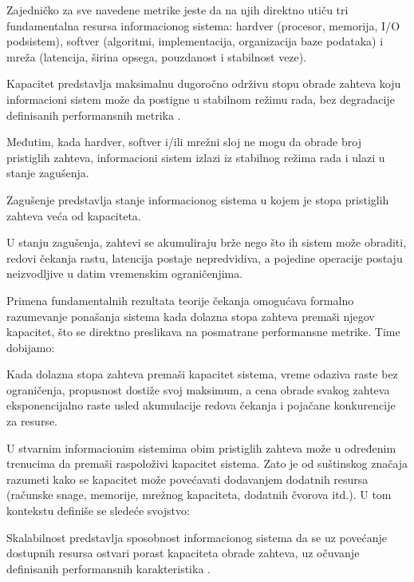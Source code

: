 Zajedničko za sve navedene metrike jeste da na njih direktno utiču tri fundamentalna resursa informacionog sistema: hardver (procesor, memorija, I/O podsistem), softver (algoritmi, implementacija, organizacija baze podataka) i mreža (latencija, širina opsega, pouzdanost i stabilnost veze).

\begin{definicija}
Kapacitet predstavlja maksimalnu dugoročno održivu stopu obrade zahteva koju informacioni sistem može da postigne u stabilnom režimu rada, bez degradacije definisanih performansnih metrika \cite{jain1991art}.
\end{definicija}

Međutim, kada hardver, softver i/ili mrežni sloj ne mogu da obrade broj pristiglih zahteva, informacioni sistem izlazi iz stabilnog režima rada i ulazi u stanje zagušenja.

\begin{definicija}
Zagušenje predstavlja stanje informacionog sistema u kojem je stopa pristiglih zahteva veća od kapaciteta.
\end{definicija}

U stanju zagušenja, zahtevi se akumuliraju brže nego što ih sistem može obraditi, redovi čekanja rastu, latencija postaje nepredvidiva, a pojedine operacije postaju neizvodljive u datim vremenskim ograničenjima.

Primena fundamentalnih rezultata teorije čekanja \cite{adan2002queueing} omogućava formalno razumevanje ponašanja sistema kada dolazna stopa zahteva premaši njegov kapacitet, što se direktno preslikava na posmatrane performansne metrike. Time dobijamo:

\begin{teorema}\label{teorema:kapacitet}
Kada dolazna stopa zahteva premaši kapacitet sistema, vreme odaziva raste bez ograničenja, propusnost dostiže svoj maksimum, a cena obrade svakog zahteva eksponencijalno raste usled akumulacije redova čekanja i pojačane konkurencije za resurse.
\end{teorema}

U stvarnim informacionim sistemima obim pristiglih zahteva može u određenim trenucima da premaši raspoloživi kapacitet sistema. Zato je od suštinskog značaja razumeti kako se kapacitet može povećavati dodavanjem dodatnih resursa (računske snage, memorije, mrežnog kapaciteta, dodatnih čvorova itd.). U tom kontekstu definiše se sledeće svojstvo:

\begin{definicija}\label{def:skalabilnost}
Skalabilnost predstavlja sposobnost informacionog sistema da se uz povećanje dostupnih resursa ostvari porast kapaciteta obrade zahteva, uz očuvanje definisanih performansnih karakteristika \cite{bondi2000characteristics}.
\end{definicija}


